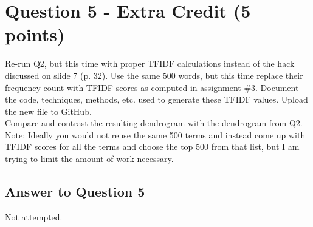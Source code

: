 \documentclass{article}
\begin{document}
\newpage

\section*{Question 5 - Extra Credit (5 points)}
Re-run Q2, but this time with proper TFIDF calculations instead of the hack discussed on slide 7 (p. 32). Use the same 500 words, but this time replace their frequency count with TFIDF scores as computed in assignment \#3. Document the code, techniques, methods, etc. used to generate these TFIDF values. Upload the new file to GitHub. \\

Compare and contrast the resulting dendrogram with the dendrogram from Q2. \\

Note: Ideally you would not reuse the same 500 terms and instead come up with TFIDF scores for all the terms and choose the top 500 from that list, but I am trying to limit the amount of work necessary.

\subsection*{Answer to Question 5}

Not attempted.




\end{document}
